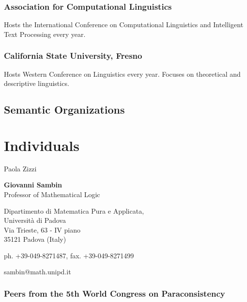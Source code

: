 \hypertarget{association-for-computational-linguistics}{%
\subsubsection{Association for Computational
Linguistics}\label{association-for-computational-linguistics}}

Hosts the International Conference on Computational Linguistics and
Intelligent Text Processing every year.

\hypertarget{california-state-university-fresno}{%
\subsubsection{California State University,
Fresno}\label{california-state-university-fresno}}

Hosts Western Conference on Linguistics every year. Focuses on
theoretical and descriptive linguistics.

\hypertarget{semantic-organizations}{%
\subsection{Semantic Organizations}\label{semantic-organizations}}

\hypertarget{individuals}{%
\section{Individuals}\label{individuals}}

Paola Zizzi

\textbf{Giovanni Sambin\\
} Professor of Mathematical Logic

Dipartimento di Matematica Pura e Applicata,\\
Università di Padova\\
Via Trieste, 63 - IV piano\\
35121 Padova (Italy)

ph. +39-049-8271487, fax. +39-049-8271499

sambin@math.unipd.it

\hypertarget{peers-from-the-5th-world-congress-on-paraconsistency}{%
\subsubsection{Peers from the 5th World Congress on
Paraconsistency}\label{peers-from-the-5th-world-congress-on-paraconsistency}}

